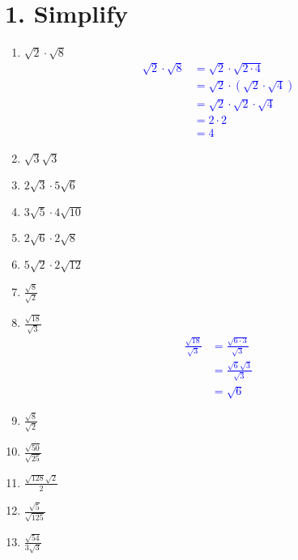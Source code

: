 \documentclass{hw}
\begin{document}
\section*{\normalsize 1. Simplify}
\begin{enumerate}[label=\alph*.]
    \item $\sqrt{2} \cdot \sqrt{8}$
        \textcolor{blue}{
        \begin{align*}
            \sqrt{2} \cdot \sqrt{8} &= \sqrt{2} \cdot \sqrt{2 \cdot 4} \\
                                    &= \sqrt{2} \cdot (\sqrt{2} \cdot \sqrt{4}) \\
                                    &= \sqrt{2} \cdot \sqrt{2} \cdot \sqrt{4} \\
                                    &= 2 \cdot 2 \\
                                    &= 4
        \end{align*}
        }
    \item $\sqrt{3}\sqrt{3}$
        \studentworkspace
    \item $2\sqrt{3} \cdot 5\sqrt{6}$
        \studentxlargeworkspace
    \item $3\sqrt{5} \cdot 4\sqrt{10}$
        \studentxlargeworkspace
    \item $2\sqrt{6} \cdot 2\sqrt{8}$
        \studentxlargeworkspace
    \item $5\sqrt{2} \cdot 2\sqrt{12}$
        \studentxlargeworkspace
    \item $\frac{\sqrt{8}}{\sqrt{2}}$
        \studentxlargeworkspace
    \item $\frac{\sqrt{18}}{\sqrt{3}}$
        \textcolor{blue}{
        \begin{align*}
            \frac{\sqrt{18}}{\sqrt{3}} &= \frac{\sqrt{6 \cdot 3}}{\sqrt{3}} \\
                                       &= \frac{\sqrt{6} \sqrt{3}}{\sqrt{3}} \\
                                       &= \sqrt{6}
        \end{align*}
        }
    \item $\frac{\sqrt{8}}{\sqrt{2}}$
        \studentxlargeworkspace
    \item $\frac{\sqrt{50}}{\sqrt{25}}$
        \studentxlargeworkspace
    \item $\frac{\sqrt{128}\sqrt{2}}{2}$
        \studentxlargeworkspace
    \item $\frac{\sqrt{5}}{\sqrt{125}}$
        \studentxlargeworkspace
    \item $\frac{\sqrt{54}}{3\sqrt{3}}$
        \studentxlargeworkspace
\end{enumerate}
\end{document}

